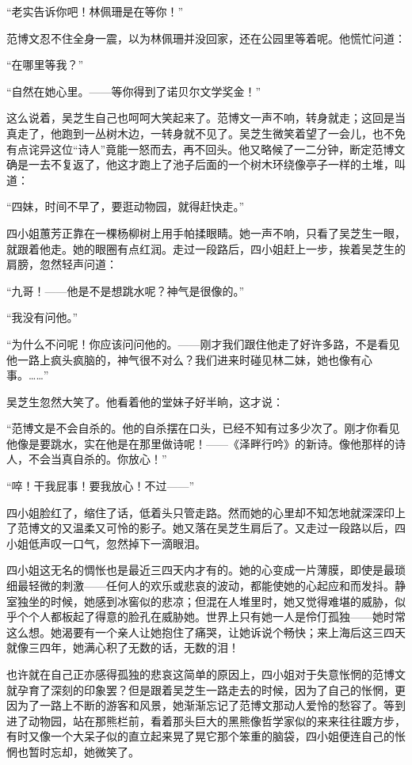 \par “老实告诉你吧！林佩珊是在等你！”
\par 范博文忍不住全身一震，以为林佩珊并没回家，还在公园里等着呢。他慌忙问道：
\par “在哪里等我？”
\par “自然在她心里。——等你得到了诺贝尔文学奖金！”
\par 这么说着，吴芝生自己也呵呵大笑起来了。范博文一声不响，转身就走；这回是当真走了，他跑到一丛树木边，一转身就不见了。吴芝生微笑着望了一会儿，也不免有点诧异这位“诗人”竟能一怒而去，再不回头。他又略候了一二分钟，断定范博文确是一去不复返了，他这才跑上了池子后面的一个树木环绕像亭子一样的土堆，叫道：
\par “四妹，时间不早了，要逛动物园，就得赶快走。”
\par 四小姐蕙芳正靠在一棵杨柳树上用手帕揉眼睛。她一声不响，只看了吴芝生一眼，就跟着他走。她的眼圈有点红润。走过一段路后，四小姐赶上一步，挨着吴芝生的肩膀，忽然轻声问道：
\par “九哥！——他是不是想跳水呢？神气是很像的。”
\par “我没有问他。”
\par “为什么不问呢！你应该问问他的。——刚才我们跟住他走了好许多路，不是看见他一路上疯头疯脑的，神气很不对么？我们进来时碰见林二妹，她也像有心事。……”
\par 吴芝生忽然大笑了。他看着他的堂妹子好半晌，这才说：
\par “范博文是不会自杀的。他的自杀摆在口头，已经不知有过多少次了。刚才你看见他像是要跳水，实在他是在那里做诗呢！——《泽畔行吟》的新诗。像他那样的诗人，不会当真自杀的。你放心！”
\par “啐！干我屁事！要我放心！不过——”
\par 四小姐脸红了，缩住了话，低着头只管走路。然而她的心里却不知怎地就深深印上了范博文的又温柔又可怜的影子。她又落在吴芝生肩后了。又走过一段路以后，四小姐低声叹一口气，忽然掉下一滴眼泪。
\par 四小姐这无名的惆怅也是最近三四天内才有的。她的心变成一片薄膜，即使是最琐细最轻微的刺激——任何人的欢乐或悲哀的波动，都能使她的心起应和而发抖。静室独坐的时候，她感到冰窖似的悲凉；但混在人堆里时，她又觉得难堪的威胁，似乎个个人都板起了得意的脸孔在威胁她。世界上只有她一人是伶仃孤独——她时常这么想。她渴要有一个亲人让她抱住了痛哭，让她诉说个畅快；来上海后这三四天就像三四年，她满心积了无数的话，无数的泪！
\par 也许就在自己正亦感得孤独的悲哀这简单的原因上，四小姐对于失意怅惘的范博文就孕育了深刻的印象罢？但是跟着吴芝生一路走去的时候，因为了自己的怅惘，更因为了一路上不断的游客和风景，她渐渐忘记了范博文那动人爱怜的愁容了。等到进了动物园，站在那熊栏前，看着那头巨大的黑熊像哲学家似的来来往往踱方步，有时又像一个大呆子似的直立起来晃了晃它那个笨重的脑袋，四小姐便连自己的怅惘也暂时忘却，她微笑了。
